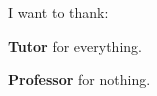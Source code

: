 \thispagestyle{empty}
\vspace*{2cm}
I want to thank:

\medskip
\noindent
\textbf{Tutor} for everything.

\medskip
\noindent
\textbf{Professor} for nothing.


\medskip
{}